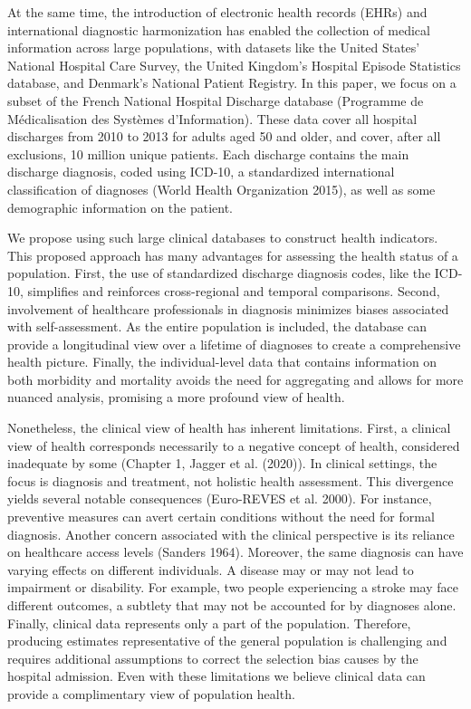\documentclass{article}
\begin{document}
At the same time, the introduction of electronic health records (EHRs)
and international diagnostic harmonization has enabled the collection of
medical information across large populations, with datasets like the
United States' National Hospital Care Survey, the United Kingdom's
Hospital Episode Statistics database, and Denmark's National Patient
Registry. In this paper, we focus on a subset of the French National
Hospital Discharge database (Programme de Médicalisation des Systèmes
d'Information). These data cover all hospital discharges from 2010 to
2013 for adults aged 50 and older, and cover, after all exclusions, 10
million unique patients. Each discharge contains the main discharge
diagnosis, coded using ICD-10, a standardized international
classification of diagnoses (World Health Organization 2015), as well as
some demographic information on the patient.

We propose using such large clinical databases to construct health
indicators. This proposed approach has many advantages for assessing the
health status of a population. First, the use of standardized discharge
diagnosis codes, like the ICD-10, simplifies and reinforces
cross-regional and temporal comparisons. Second, involvement of
healthcare professionals in diagnosis minimizes biases associated with
self-assessment. As the entire population is included, the database can
provide a longitudinal view over a lifetime of diagnoses to create a
comprehensive health picture. Finally, the individual-level data that
contains information on both morbidity and mortality avoids the need for
aggregating and allows for more nuanced analysis, promising a more
profound view of health.

Nonetheless, the clinical view of health has inherent limitations.
First, a clinical view of health corresponds necessarily to a negative
concept of health, considered inadequate by some (Chapter 1, Jagger et
al. (2020)). In clinical settings, the focus is diagnosis and treatment,
not holistic health assessment. This divergence yields several notable
consequences (Euro-REVES et al. 2000). For instance, preventive measures
can avert certain conditions without the need for formal diagnosis.
Another concern associated with the clinical perspective is its reliance
on healthcare access levels (Sanders 1964). Moreover, the same diagnosis
can have varying effects on different individuals. A disease may or may
not lead to impairment or disability. For example, two people
experiencing a stroke may face different outcomes, a subtlety that may
not be accounted for by diagnoses alone. Finally, clinical data
represents only a part of the population. Therefore, producing estimates
representative of the general population is challenging and requires
additional assumptions to correct the selection bias causes by the
hospital admission. Even with these limitations we believe clinical data
can provide a complimentary view of population health.
\end{document}
